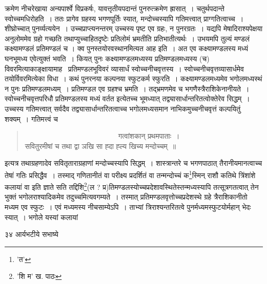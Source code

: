 \documentclass[11pt, openany]{book}
\begin{document}
{{{{\vspace{0.3cm}
\noindent क्रमेण नीचरेखाया अन्यपार्श्वे विप्रकर्षः, यावत्तृतीयपदान्तं पुनरुत्क्रमेण ह्रासात्~। चतुर्थपदान्ते स्वोच्चमधिरोहति~। ततः प्रागेव ग्रहस्य भगणपूर्तिः स्यात्, मन्दोच्चस्यापि गतिमत्त्वात् प्राग्गतित्वाच्च~। शीघ्रोच्चात् पुनर्व्यत्ययेन~। उच्चप्राप्त्यनन्तरम् उच्चस्य पृष्ट एव ग्रहः, न
पुनरग्रतः~। यद्यपि मेषादिराश्यपेक्षया अनुलोममेव ग्रहो गच्छति तथाप्युच्चाहितदृष्टेः प्रतिलोमं भ्रमतीति प्रतिभातीत्यर्थः~। उभयमपि तुल्यं मण्डलं
कक्ष्यामण्डलं प्रतिमण्डलं च । क्व पुनस्तयोरवस्थानमित्यत आह  इति~। अत एव कक्ष्यामण्डलस्य मध्यं घनभूमध्य एवेत्युक्तं भवति~। कियत् पुनः कक्ष्यामण्डलमध्यस्य प्रतिमण्डलमध्यस्य (च) विवरमित्याकाङ्क्षायामाह \textendash\ {\qt प्रतिमण्डलभूविवरं व्यासार्धं स्वोच्चनीचवृत्तस्य}~। स्वोच्चनीचवृत्तव्यासार्धमेव तयोर्विवरमित्येका विधा~। कथं पुनरनया कल्पनया स्फुटकर्म स्फुरति~। कक्ष्यामण्डलमध्यमेव भगोलमध्यस्थं न पुनः प्रतिमण्डलमध्यम्~। प्रतिमण्डल एव ग्रहश्च भ्रमति~। तद्भ्रमणमेव च भगणैस्त्रैराशिकेनानीयते~। स्वोच्चनीचवृत्तपरिधौ प्रतिमण्डलस्य मध्यं वर्तत इत्येतच्च भूमध्यात् तद्व्यासार्धान्तरितत्वोक्तेरेव सिद्धम्~। उच्चस्य गतिमत्त्वात् सर्वदैव तद्व्यासार्धान्तरितत्वाच्च भगोलमध्यसमान नाभिकमुच्चनीचवृत्तं कल्पयितुं शक्यम्~। गतिमत्त्वं च\textendash

\begin{quote} 
~~~~~~~~~~~~~~~~~~~~~~~~~~{\qt गत्वांशकान् प्रथमपाताः~।\\
सवितुरमीषां च तथा द्वा ञखि सा ह्दा ह्ल्य खिच्य मन्दोच्चम्~॥}
\end{quote}

\noindent इत्यत्र तथाग्रहणादेव सवितृताराग्रहाणां मन्दोच्चस्यापि सिद्धम्~। शास्त्रान्तरे च भगणपाठात् तैरानीयमानत्वाच्च तेषां गतिः प्रसिद्धैव~। तस्माद् गणितानीतं वा परीक्ष्य प्रदर्शितं वा तन्मन्दोच्चं क\renewcommand{\thefootnote}{१}\footnote{'त'}स्मिन् राशौ कतिथे त्रिंशांशे कलायां वा इति ज्ञाते सति तद्दिशि\renewcommand{\thefootnote}{२}\footnote{'शि म' ख. पाठः}(ल ?
प्र)तिमण्डलस्योच्चप्रदेशावस्थितेस्तन्मध्यस्यापि तत्सूत्रगतत्वात् तेन भुक्तं भगोलराश्यादिकमेव तदुच्चमित्यवगम्यते~। तस्मात् प्रतिमण्डलवृत्तोच्चप्रदेशस्थे ग्रहे त्रैराशिकानीतो मध्यम एव स्फुटः~। एवं मध्यमस्य नीचसाम्येऽपि~। ताभ्यां त्रिराश्यन्तरितत्वे पुनर्मध्यमस्फुटयोर्महान् भेदः स्यात्~। भगोले यस्यां कलायां


\newpage

\vspace{3cm} ३४\hspace{4cm} आर्यभटीये सभाष्ये

}}}}
\end{document}
